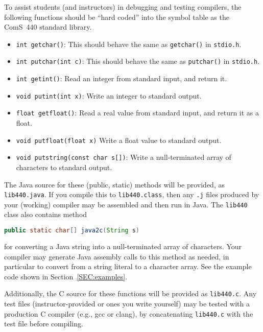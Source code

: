 \documentclass{article}
\begin{document}
To assist students (and instructors) in debugging and testing compilers,
the following functions should be ``hard coded'' into the symbol table
as the ComS~440 standard library.
\begin{itemize}
  \item \lstinline|int getchar()|:
    This should behave the same as {\tt getchar()} in {\tt stdio.h}.

  \item \lstinline|int putchar(int c)|:
    This should behave the same as {\tt putchar()} in {\tt stdio.h}.

  \item \lstinline|int getint()|:
    Read an integer from standard input, and return it.

  \item \lstinline|void putint(int x)|:
    Write an integer to standard output.

  \item \lstinline|float getfloat()|:
    Read a real value from standard input, and return it as a float.

  \item \lstinline|void putfloat(float x)|
    Write a float value to standard output.

  \item \lstinline|void putstring(const char s[])|:
    Write a null-terminated array of characters to standard output.
\end{itemize}
The Java source for these (public, static) methods will be provided,
as {\tt lib440.java}.
If you compile this to {\tt lib440.class},
then any {\tt .j} files produced by your (working) compiler may be
assembled and then run in Java.
The {\tt lib440} class also contains method
\begin{lstlisting}[language=Java, numbers=none]
public static char[] java2c(String s)
\end{lstlisting}
for converting a Java string into a null-terminated array of characters.
Your compiler may generate Java assembly calls to this method as needed,
in particular to convert from a string literal to a character array.
See the example code shown in Section~\ref{SEC:examples}.

Additionally,
the C source for these functions will be provided as
{\tt lib440.c}.
Any test files (instructor-provided or ones you write yourself)
may be tested with a production C compiler (e.g., gcc or clang),
by concatenating {\tt lib440.c} with the test file before compiling.
\end{document}
